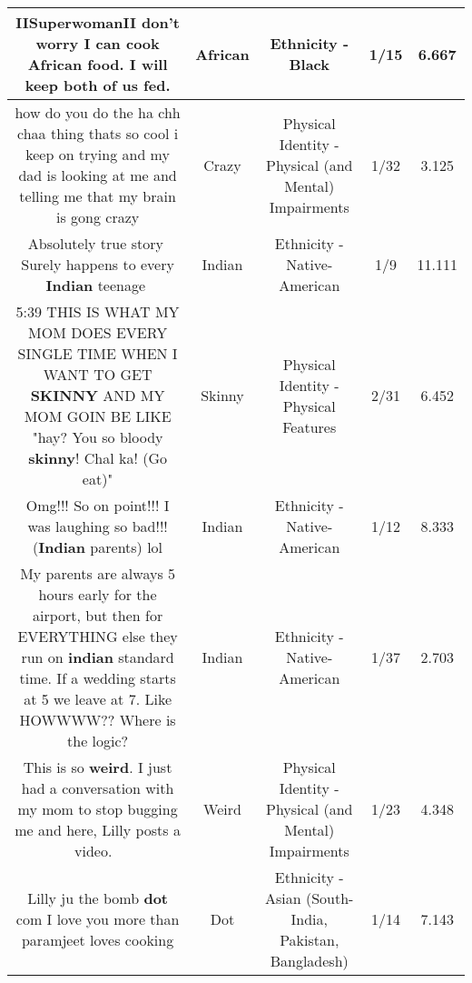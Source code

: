 \documentclass[11pt]{article}
\newlength\mylength
\begin{document}
\begin{center}
\begin{longtable}{|C{.65\mylength}|C{.30\mylength}|C{.12\mylength}|C{.12\mylength}|C{.12\mylength}|}
  \small IISuperwomanII don't worry I can cook \textbf{African} food. I will keep both of us fed.\normalsize   & African & Ethnicity - Black & 1/15 & 6.667 \\  \hline
  \small how do you do the ha chh chaa thing thats so cool i keep on trying and my dad is looking at me and  telling me that my brain is gong crazy\normalsize   & Crazy & Physical Identity - Physical (and Mental) Impairments & 1/32 & 3.125 \\  \hline
  \small Absolutely true story🙏Surely happens to every \textbf{Indian} teenage🙌\normalsize   & Indian & Ethnicity - Native-American & 1/9 & 11.111 \\  \hline
  \small 5:39 THIS IS WHAT MY MOM DOES EVERY SINGLE TIME WHEN I WANT TO GET \textbf{SKINNY} AND MY MOM GOIN BE LIKE "hay? You so bloody \textbf{skinny}! Chal ka! (Go eat)"\normalsize   & Skinny & Physical Identity - Physical Features & 2/31 & 6.452 \\  \hline
  \small Omg!!! So on point!!! I was laughing so bad!!! (\textbf{Indian} parents) lol\normalsize   & Indian & Ethnicity - Native-American & 1/12 & 8.333 \\  \hline
  \small My parents are always 5 hours early for the airport, but then for EVERYTHING else they run on \textbf{indian} standard time. If a wedding starts at 5 we leave at 7. Like HOWWWW?? Where is the logic?\normalsize   & Indian & Ethnicity - Native-American & 1/37 & 2.703 \\  \hline
  \small This is so \textbf{weird}. I just had a conversation with my mom to stop bugging me and here, Lilly posts a video. 🙌\normalsize   & Weird & Physical Identity - Physical (and Mental) Impairments & 1/23 & 4.348 \\  \hline
  \small Lilly ju the bomb \textbf{dot} com I love you more than paramjeet loves cooking\normalsize   & Dot & Ethnicity - Asian (South- India, Pakistan, Bangladesh) & 1/14 & 7.143 \\  \hline

\end{longtable}
\end{center}
\end{document}
